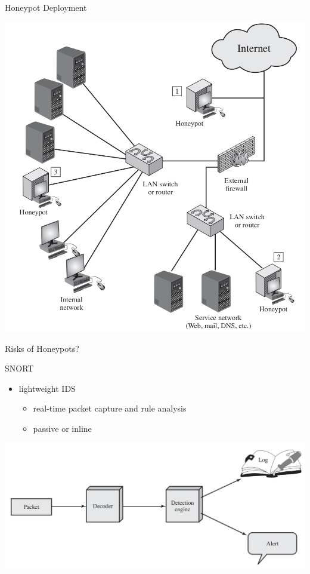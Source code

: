 \documentclass{beamer}
\begin{document}
\begin{frame}{Honeypot Deployment}
   \begin{center}
    \includegraphics[width=0.6\linewidth]{honey}
  \end{center}
\end{frame}

\begin{frame}{Risks of Honeypots?}
\end{frame}

\begin{frame}{SNORT}
  \begin{itemize}
  \item lightweight IDS 
    \begin{itemize}
    \item real-time packet capture and rule analysis 
    \item passive or inline
    \end{itemize}
  \end{itemize}
   \begin{center}
    \includegraphics[width=1\linewidth]{snort}
  \end{center}
\end{frame}
\end{document}
